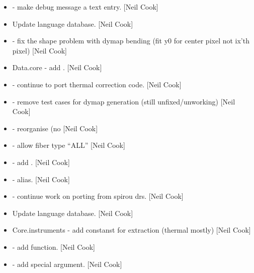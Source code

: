 \documentclass[a4paper,10pt,english]{report}
\begin{document}
\begin{itemize}
\item {} 
 - make debug message a text entry. {[}Neil Cook{]}

\item {} 
Update language database. {[}Neil Cook{]}

\item {} 
 - fix the shape problem with dymap bending (fit y0 for
center pixel not ix’th pixel) {[}Neil Cook{]}

\item {} 
Data.core - add . {[}Neil Cook{]}

\item {} 
 - continue to port thermal correction code. {[}Neil
Cook{]}

\item {} 
 - remove test cases for dymap generation (still
unfixed/unworking) {[}Neil Cook{]}

\item {} 
 - reorganise  (no  {[}Neil
Cook{]}

\item {} 
 - allow fiber type “ALL” {[}Neil Cook{]}

\item {} 
 - add . {[}Neil Cook{]}

\item {} 
 -  alias. {[}Neil Cook{]}

\item {} 
 - continue work on porting from spirou drs.
{[}Neil Cook{]}

\item {} 
Update language database. {[}Neil Cook{]}

\item {} 
Core.instruments - add constanst for extraction (thermal mostly) {[}Neil
Cook{]}

\item {} 
 - add  function. {[}Neil Cook{]}

\item {} 
 - add  special argument. {[}Neil Cook{]}


\end{itemize}
\end{document}
